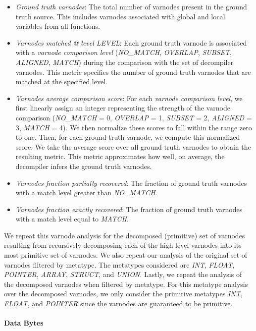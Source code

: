 \documentclass[conference]{IEEEtran}
\begin{document}
\begin{itemize}
    \item \emph{Ground truth varnodes}: The total number of varnodes present in the ground truth source. This includes varnodes associated with global and local variables from all functions.
    \item \emph{Varnodes matched @ level LEVEL}: Each ground truth varnode is associated with a \emph{varnode comparison level} (\emph{NO\_MATCH}, \emph{OVERLAP}, \emph{SUBSET}, \emph{ALIGNED}, \emph{MATCH}) during the comparison with the set of decompiler varnodes. This metric specifies the number of ground truth varnodes that are matched at the specified level.
    \item \emph{Varnodes average comparison score}: For each \emph{varnode comparison level}, we first linearly assign an integer representing the strength of the varnode comparison (\emph{NO\_MATCH} = 0, \emph{OVERLAP} = 1, \emph{SUBSET} = 2, \emph{ALIGNED} = 3, \emph{MATCH} = 4). We then normalize these scores to fall within the range zero to one. Then, for each ground truth varnode, we compute this normalized score. We take the average score over all ground truth varnodes to obtain the resulting metric. This metric approximates how well, on average, the decompiler infers the ground truth varnodes.
    \item \emph{Varnodes fraction partially recovered}: The fraction of ground truth varnodes with a match level greater than \emph{NO\_MATCH}.
    \item \emph{Varnodes fraction exactly recovered}: The fraction of ground truth varnodes with a match level equal to \emph{MATCH}.
\end{itemize}

We repeat this varnode analysis for the decomposed (primitive) set of varnodes resulting from recursively decomposing each of the high-level varnodes into its most primitive set of varnodes. We also repeat our analysis of the original set of varnodes filtered by metatype. The metatypes considered are \emph{INT}, \emph{FLOAT}, \emph{POINTER}, \emph{ARRAY}, \emph{STRUCT}, and \emph{UNION}. Lastly, we repeat the analysis of the decomposed varnodes when filtered by metatype. For this metatype analysis over the decomposed varnodes, we only consider the primitive metatypes \emph{INT}, \emph{FLOAT}, and \emph{POINTER} since the varnodes are guaranteed to be primitive.

\paragraph{Data Bytes}
\end{document}
